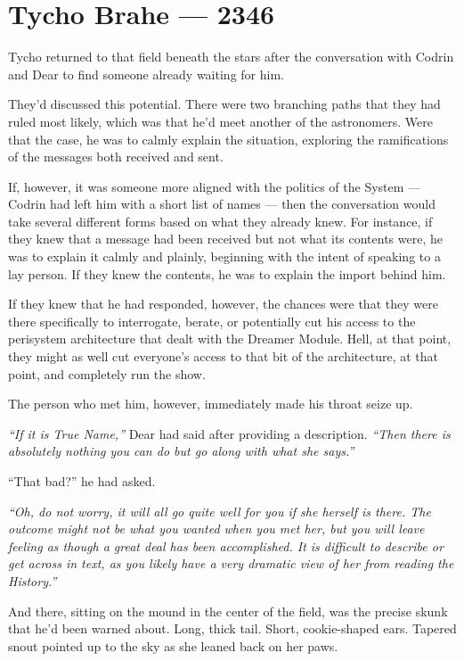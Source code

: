 \hypertarget{tycho-brahe-2346}{%
\chapter{Tycho Brahe — 2346}\label{tycho-brahe-2346}}

Tycho returned to that field beneath the stars after the conversation with Codrin and Dear to find someone already waiting for him.

They'd discussed this potential. There were two branching paths that they had ruled most likely, which was that he'd meet another of the astronomers. Were that the case, he was to calmly explain the situation, exploring the ramifications of the messages both received and sent.

If, however, it was someone more aligned with the politics of the System — Codrin had left him with a short list of names — then the conversation would take several different forms based on what they already knew. For instance, if they knew that a message had been received but not what its contents were, he was to explain it calmly and plainly, beginning with the intent of speaking to a lay person. If they knew the contents, he was to explain the import behind him.

If they knew that he had responded, however, the chances were that they were there specifically to interrogate, berate, or potentially cut his access to the perisystem architecture that dealt with the Dreamer Module. Hell, at that point, they might as well cut everyone's access to that bit of the architecture, at that point, and completely run the show.

The person who met him, however, immediately made his throat seize up.

\emph{``If it is True Name,''} Dear had said after providing a description. \emph{``Then there is absolutely nothing you can do but go along with what she says.''}

``That bad?'' he had asked.

\emph{``Oh, do not worry, it will all go quite well for you if she herself is there. The outcome might not be what you wanted when you met her, but you will leave feeling as though a great deal has been accomplished. It is difficult to describe or get across in text, as you likely have a very dramatic view of her from reading the History.''}

And there, sitting on the mound in the center of the field, was the precise skunk that he'd been warned about. Long, thick tail. Short, cookie-shaped ears. Tapered snout pointed up to the sky as she leaned back on her paws.

